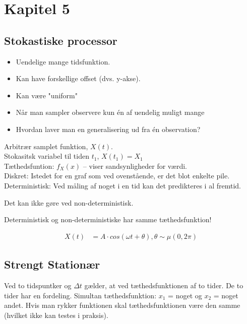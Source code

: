 \documentclass[Main]{subfiles}
\begin{document}
\chapter{Kapitel 5} %

\section{Stokastiske processor} %
\label{sec:stokastiske_processor}


\begin{itemize}
\item Uendelige mange tidsfunktion.
\item Kan have forskellige offset (dvs. y-akse).
\item Kan være "uniform" 
\item Når man sampler observere kun én af uendelig muligt mange
\item Hvordan laver man en generalisering ud fra én observation?
\end{itemize}

Arbitrær samplet funktion, $X(t)$.
\\
Stokasitsk variabel til tiden $t_1$, $X(t_1) = X_1$
\\
Tæthedsfuntion: $f_X(x)$ -- viser sandsynligheder for værdi.
\\
Diskret: Istedet for en graf som ved ovenstående, er det blot enkelte pile.
\\
Deterministisk: Ved måling af noget i en tid kan det predikteres i al fremtid.

Det kan ikke gøre ved non-deterministisk.

Deterministisk og non-deterministiske har samme tæthedsfunktion!

\begin{align*}
X(t) &= A\cdot cos( \omega t+\theta), \theta \sim \mu(0, 2\pi)
\end{align*}


\section{Strengt Stationær} %

Ved to tidspuntker og $\Delta t$ gælder, at ved tæthedsfunktionen af to tider.
De to tider har en fordeling.
Simultan tæthedsfunktion: $x_1$ = noget og $x_2$ = noget andet.
Hvis man rykker funktionen skal tæthedsfunktionen være den samme (hvilket ikke kan testes i praksis).
\end{document}
